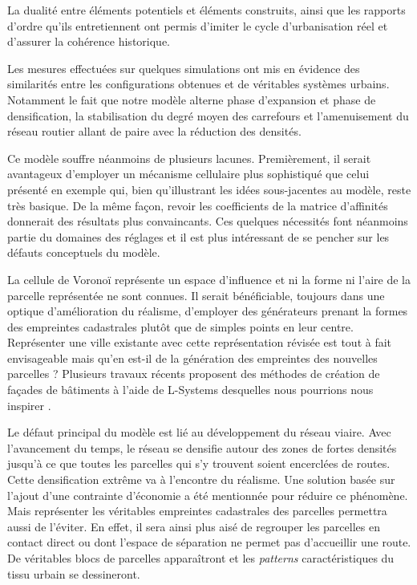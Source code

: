 \documentclass[10pt]{article}
\begin{document}
La dualité entre éléments potentiels et éléments construits, ainsi que
les rapports d'ordre qu'ils entretiennent ont permis d'imiter le cycle
d'urbanisation réel et d'assurer la cohérence historique.

Les mesures effectuées sur quelques simulations ont mis en évidence
des similarités entre les configurations obtenues et de véritables
systèmes urbains. Notamment le fait que notre modèle alterne phase
d'expansion et phase de densification, la stabilisation du degré moyen
des carrefours et l'amenuisement du réseau routier allant de paire
avec la réduction des densités.

Ce modèle souffre néanmoins de plusieurs lacunes. Premièrement, il
serait avantageux d'employer un mécanisme cellulaire plus sophistiqué
que celui présenté en exemple qui, bien qu'illustrant les idées
sous-jacentes au modèle, reste très basique. De la même façon, revoir
les coefficients de la matrice d'affinités donnerait des résultats
plus convaincants. Ces quelques nécessités font néanmoins partie du
domaines des réglages et il est plus intéressant de se pencher sur les
défauts conceptuels du modèle.

La cellule de Voronoï représente un espace d'influence et ni la forme
ni l'aire de la parcelle représentée ne sont connues. Il serait
bénéficiable, toujours dans une optique d'amélioration du réalisme,
d'employer des générateurs prenant la formes des empreintes
cadastrales plutôt que de simples points en leur centre. Représenter
une ville existante avec cette représentation révisée est tout à fait
envisageable mais qu'en est-il de la génération des empreintes des
nouvelles parcelles ? Plusieurs travaux récents proposent des méthodes
de création de façades de bâtiments à l'aide de L-Systems desquelles
nous pourrions nous inspirer \cite{Parish2001}.

Le défaut principal du modèle est lié au développement du réseau
viaire. Avec l'avancement du temps, le réseau se densifie autour des
zones de fortes densités jusqu'à ce que toutes les parcelles qui s'y
trouvent soient encerclées de routes. Cette densification extrême va à
l'encontre du réalisme. Une solution basée sur l'ajout d'une
contrainte d'économie a été mentionnée pour réduire ce phénomène. Mais
représenter les véritables empreintes cadastrales des parcelles
permettra aussi de l'éviter. En effet, il sera ainsi plus aisé de
regrouper les parcelles en contact direct ou dont l'espace de
séparation ne permet pas d'accueillir une route. De véritables blocs
de parcelles apparaîtront et les \textit{patterns} caractéristiques du
tissu urbain se dessineront.

\printbibliography
\end{document}
